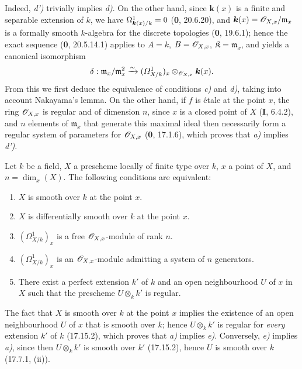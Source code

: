 Indeed, \emph{d')} trivially implies \emph{d)}. On the other hand, since $\boldsymbol{k}(x)$ is a finite and separable extension of $k$, we have $\Omega^1_{\boldsymbol{k}(x)/k}=0$ (\textbf{0}, 20.6.20), and $\boldsymbol{k}(x)=\mathscr{O}_{X,x}/\mathfrak m_x$ is a formally smooth $k$-algebra for the discrete topologies (\textbf{0}, 19.6.1); hence the exact sequence (\textbf{0}, 20.5.14.1) applies to $A=k$, $B=\mathscr{O}_{X,x}$, $\mathfrak{K}=\mathfrak m_x$, and yields a canonical isomorphism
\[
\delta:\mathfrak m_x/\mathfrak m_x^2\xrightarrow{\sim}(\varOmega^1_{X/k})_x\otimes_{\mathscr{O}_{X,x}}\boldsymbol{k}(x).
\]
From this we first deduce the equivalence of conditions \emph{c)} and \emph{d)}, taking into account Nakayama's lemma. On the other hand, if $f$ is étale at the point $x$, the ring $\mathscr{O}_{X,x}$ is regular and of dimension $n$, since $x$ is a closed point of $X$ (\textbf{I}, 6.4.2), and $n$ elements of $\mathfrak m_x$ that generate this maximal ideal then necessarily form a regular system of parameters for $\mathscr{O}_{X,x}$ (\textbf{0}, 17.1.6), which proves that \emph{a)} implies \emph{d')}.

\begin{proposition}[17.15.5]
\label{IV.17.15.5}
Let $k$ be a field, $X$ a prescheme locally of finite type over $k$, $x$ a point of $X$, and $n=\dim_x(X)$. The following conditions are equivalent:
\begin{enumerate}
  \item[\textup{a)}] $X$ is smooth over $k$ at the point $x$.
  \item[\textup{b)}] $X$ is differentially smooth over $k$ at the point $x$.
  \item[\textup{c)}] $(\varOmega^1_{X/k})_x$ is a free $\mathscr{O}_{X,x}$-module of rank $n$.
  \item[\textup{d)}] $(\varOmega^1_{X/k})_x$ is an $\mathscr{O}_{X,x}$-module admitting a system of $n$ generators.


  \item[\textup{e)}] There exist a perfect extension $k'$ of $k$ and an open neighbourhood $U$ of $x$ in $X$ such that the prescheme $U\otimes_k k'$ is regular.
\end{enumerate}
\end{proposition}

The fact that $X$ is smooth over $k$ at the point $x$ implies the existence of an open neighbourhood $U$ of $x$ that is smooth over $k$; hence $U\otimes_k k'$ is regular for \emph{every} extension $k'$ of $k$ (17.15.2), which proves that \emph{a)} implies \emph{e)}. Conversely, \emph{e)} implies \emph{a)}, since then $U\otimes_k k'$ is smooth over $k'$ (17.15.2), hence $U$ is smooth over $k$ (17.7.1, (ii)).

